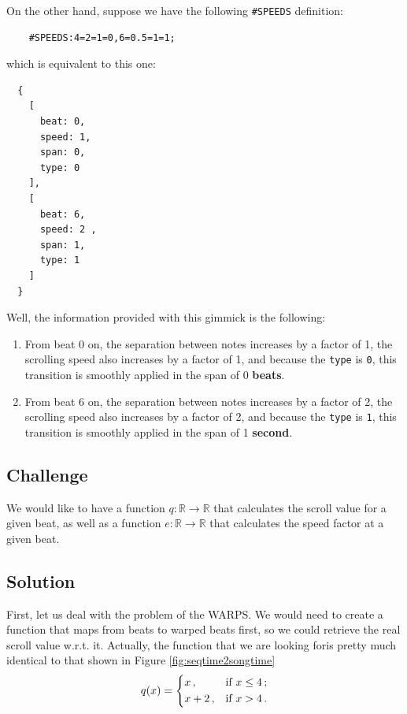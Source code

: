 \documentclass[a4paper,9pt]{article}
\begin{document}
    On the other hand, suppose we have the following \texttt{\#SPEEDS} definition:
    \begin{verbatim}
    #SPEEDS:4=2=1=0,6=0.5=1=1;     
    \end{verbatim}
    which is equivalent to this one:
    \begin{verbatim}
  {
    [
      beat: 0,
      speed: 1,
      span: 0,
      type: 0
    ],
    [
      beat: 6,
      speed: 2 ,
      span: 1,
      type: 1
    ]
  }
    \end{verbatim}
 
    Well, the information provided with this gimmick is the following:
    \begin{enumerate}
	    \item From beat 0 on, the separation between notes increases by a factor of 1, the scrolling speed also increases by a factor of 1, and because the \texttt{type} is \texttt{0},  this transition is smoothly applied in the span of 0 \textbf{beats}.
	    \item From beat 6 on, the separation between notes increases by a factor of 2, the scrolling speed also increases by a factor of 2, and because the \texttt{type} is \texttt{1}, this transition is smoothly applied in the span of 1 \textbf{second}.
    \end{enumerate}

    \subsection{Challenge}

    We would like to have a function $ q: \mathbb{R}\rightarrow \mathbb{R} $ that calculates the scroll value for a given beat, as well as a function $ e: \mathbb{R}\rightarrow \mathbb{R} $ that calculates the speed factor at a given beat.

    \subsection{Solution}

    First, let us deal with the problem of the WARPS. We would need to create a function that maps from beats to warped beats first, so we could retrieve the real scroll value w.r.t. it.
    Actually, the function that we are looking foris pretty much identical to that shown in Figure \ref{fig:seqtime2songtime}
    \begin{equation}
	    q(x) = \begin{dcases}
		    x\,, &\text{if $ x \leq 4 $}\,;\\
		    x + 2\,, &\text{if $ x > 4 $}\,.\\
	    \end{dcases}
	    \label{eq:warps-example}
    \end{equation}
\end{document}

